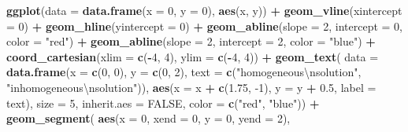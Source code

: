 \documentclass[
]{book}
\newenvironment{Shaded}{\begin{snugshade}}{\end{snugshade}}
\newcommand{\CharTok}[1]{\textcolor[rgb]{0.31,0.60,0.02}{#1}}
\newcommand{\DataTypeTok}[1]{\textcolor[rgb]{0.13,0.29,0.53}{#1}}
\newcommand{\DecValTok}[1]{\textcolor[rgb]{0.00,0.00,0.81}{#1}}
\newcommand{\FloatTok}[1]{\textcolor[rgb]{0.00,0.00,0.81}{#1}}
\newcommand{\KeywordTok}[1]{\textcolor[rgb]{0.13,0.29,0.53}{\textbf{#1}}}
\newcommand{\NormalTok}[1]{#1}
\newcommand{\OperatorTok}[1]{\textcolor[rgb]{0.81,0.36,0.00}{\textbf{#1}}}
\newcommand{\OtherTok}[1]{\textcolor[rgb]{0.56,0.35,0.01}{#1}}
\newcommand{\StringTok}[1]{\textcolor[rgb]{0.31,0.60,0.02}{#1}}
\theoremstyle{definition}
\theoremstyle{definition}
\theoremstyle{definition}
\theoremstyle{remark}
\begin{document}
\begin{Shaded}
\begin{Highlighting}[]
\KeywordTok{ggplot}\NormalTok{(}\DataTypeTok{data =} \KeywordTok{data.frame}\NormalTok{(}\DataTypeTok{x =} \DecValTok{0}\NormalTok{, }\DataTypeTok{y =} \DecValTok{0}\NormalTok{), }\KeywordTok{aes}\NormalTok{(x, y)) }\OperatorTok{+}
\StringTok{    }\KeywordTok{geom_vline}\NormalTok{(}\DataTypeTok{xintercept =} \DecValTok{0}\NormalTok{) }\OperatorTok{+}
\StringTok{    }\KeywordTok{geom_hline}\NormalTok{(}\DataTypeTok{yintercept =} \DecValTok{0}\NormalTok{) }\OperatorTok{+}
\StringTok{    }\KeywordTok{geom_abline}\NormalTok{(}\DataTypeTok{slope =} \DecValTok{2}\NormalTok{, }\DataTypeTok{intercept =} \DecValTok{0}\NormalTok{, }\DataTypeTok{color =} \StringTok{"red"}\NormalTok{) }\OperatorTok{+}
\StringTok{    }\KeywordTok{geom_abline}\NormalTok{(}\DataTypeTok{slope =} \DecValTok{2}\NormalTok{, }\DataTypeTok{intercept =} \DecValTok{2}\NormalTok{, }\DataTypeTok{color =} \StringTok{"blue"}\NormalTok{) }\OperatorTok{+}
\StringTok{    }\KeywordTok{coord_cartesian}\NormalTok{(}\DataTypeTok{xlim =} \KeywordTok{c}\NormalTok{(}\OperatorTok{-}\DecValTok{4}\NormalTok{, }\DecValTok{4}\NormalTok{), }\DataTypeTok{ylim =} \KeywordTok{c}\NormalTok{(}\OperatorTok{-}\DecValTok{4}\NormalTok{, }\DecValTok{4}\NormalTok{))  }\OperatorTok{+}
\StringTok{    }\KeywordTok{geom_text}\NormalTok{(}
        \DataTypeTok{data =} \KeywordTok{data.frame}\NormalTok{(}\DataTypeTok{x =} \KeywordTok{c}\NormalTok{(}\DecValTok{0}\NormalTok{, }\DecValTok{0}\NormalTok{), }\DataTypeTok{y =} \KeywordTok{c}\NormalTok{(}\DecValTok{0}\NormalTok{, }\DecValTok{2}\NormalTok{), }\DataTypeTok{text =} \KeywordTok{c}\NormalTok{(}\StringTok{"homogeneous}\CharTok{\textbackslash{}n}\StringTok{solution"}\NormalTok{, }\StringTok{"inhomogeneous}\CharTok{\textbackslash{}n}\StringTok{solution"}\NormalTok{)),}
        \KeywordTok{aes}\NormalTok{(}\DataTypeTok{x =}\NormalTok{ x }\OperatorTok{+}\StringTok{ }\KeywordTok{c}\NormalTok{(}\FloatTok{1.75}\NormalTok{, }\DecValTok{-1}\NormalTok{), }\DataTypeTok{y =}\NormalTok{ y }\OperatorTok{+}\StringTok{ }\FloatTok{0.5}\NormalTok{, }\DataTypeTok{label =}\NormalTok{ text), }\DataTypeTok{size =} \DecValTok{5}\NormalTok{, }\DataTypeTok{inherit.aes =} \OtherTok{FALSE}\NormalTok{,}
        \DataTypeTok{color =} \KeywordTok{c}\NormalTok{(}\StringTok{"red"}\NormalTok{, }\StringTok{"blue"}\NormalTok{)) }\OperatorTok{+}
\StringTok{    }\KeywordTok{geom_segment}\NormalTok{(}
        \KeywordTok{aes}\NormalTok{(}\DataTypeTok{x =} \DecValTok{0}\NormalTok{, }\DataTypeTok{xend =} \DecValTok{0}\NormalTok{, }\DataTypeTok{y =} \DecValTok{0}\NormalTok{, }\DataTypeTok{yend =} \DecValTok{2}\NormalTok{),}

\end{Highlighting}
\end{Shaded}
\end{document}
